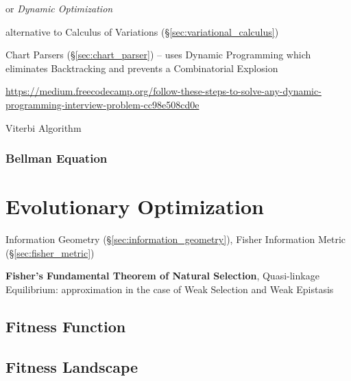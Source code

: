 or \emph{Dynamic Optimization}

alternative to Calculus of Variations (\S\ref{sec:variational_calculus})

\fist Chart Parsers (\S\ref{sec:chart_parser}) -- uses Dynamic Programming which
eliminates Backtracking and prevents a Combinatorial Explosion

\url{https://medium.freecodecamp.org/follow-these-steps-to-solve-any-dynamic-programming-interview-problem-cc98e508cd0e}

Viterbi Algorithm



\subsubsection{Bellman Equation}\label{sec:bellman_equation}



\section{Evolutionary Optimization}\label{sec:evolutionary_optimization}

\fist Information Geometry (\S\ref{sec:information_geometry}), Fisher
Information Metric (\S\ref{sec:fisher_metric})

\fist \textbf{Fisher's Fundamental Theorem of Natural Selection},
Quasi-linkage Equilibrium: approximation in the case of Weak Selection
and Weak Epistasis %



\subsection{Fitness Function}\label{sec:fitness_function}

\subsection{Fitness Landscape}\label{sec:fitness_landscape}

